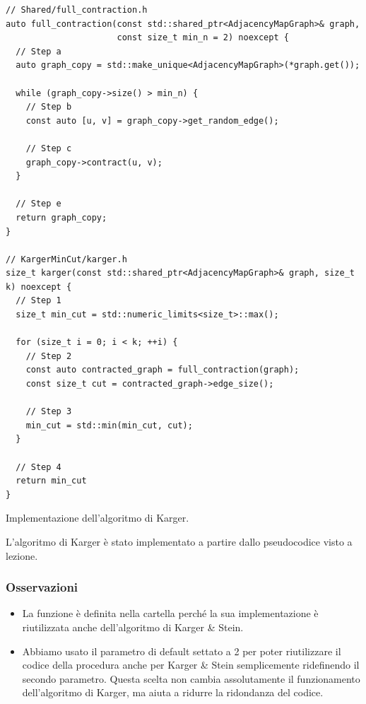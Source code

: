 \begin{listing}[!ht]
\begin{verbatim}
// Shared/full_contraction.h
auto full_contraction(const std::shared_ptr<AdjacencyMapGraph>& graph,
                      const size_t min_n = 2) noexcept {
  // Step a
  auto graph_copy = std::make_unique<AdjacencyMapGraph>(*graph.get());

  while (graph_copy->size() > min_n) {
    // Step b
    const auto [u, v] = graph_copy->get_random_edge();

    // Step c
    graph_copy->contract(u, v);
  }

  // Step e
  return graph_copy;
}

// KargerMinCut/karger.h
size_t karger(const std::shared_ptr<AdjacencyMapGraph>& graph, size_t k) noexcept {
  // Step 1
  size_t min_cut = std::numeric_limits<size_t>::max();

  for (size_t i = 0; i < k; ++i) {
    // Step 2
    const auto contracted_graph = full_contraction(graph);
    const size_t cut = contracted_graph->edge_size();

    // Step 3
    min_cut = std::min(min_cut, cut);
  }

  // Step 4
  return min_cut
}
\end{verbatim}
\caption{Implementazione dell'algoritmo di Karger.}
\label{listing:karger}
\end{listing}

\noindent L'algoritmo di Karger è stato implementato a partire dallo pseudocodice visto a lezione. \\

\subsubsection{Osservazioni}

\begin{itemize}
    \item La funzione  è definita nella cartella  perché la sua implementazione è riutilizzata anche dell'algoritmo di Karger \& Stein.
    \item Abbiamo usato il parametro di default  settato a 2 per poter riutilizzare il codice della procedura anche per Karger \& Stein semplicemente ridefinendo il secondo parametro. Questa scelta non cambia assolutamente il funzionamento dell'algoritmo di Karger, ma aiuta a ridurre la ridondanza del codice.
\end{itemize}

